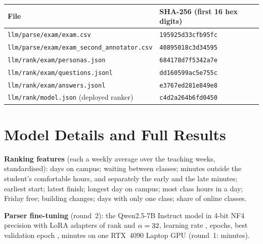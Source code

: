 \begin{center}\small
\begin{tabular}{@{}ll@{}}
	\toprule
	File & SHA-256 (first 16 hex digits) \\
	\midrule
	\texttt{llm/parse/exam/exam.csv} & \texttt{195925d33cfb95fc} \\
	\texttt{llm/parse/exam/exam\_second\_annotator.csv} & \texttt{40895018c3d34595} \\
	\texttt{llm/rank/exam/personas.json} & \texttt{684178d7f5342a7e} \\
	\texttt{llm/rank/exam/questions.jsonl} & \texttt{dd160599ac5e755c} \\
	\texttt{llm/rank/exam/answers.jsonl} & \texttt{e3767ed281e849e8} \\
	\texttt{llm/rank/model.json} (deployed ranker) & \texttt{c4d2a264b6fd0450} \\
	\bottomrule
\end{tabular}
\end{center}

\section{Model Details and Full Results}\label{app:model}

\textbf{Ranking features} (each a weekly average over the teaching weeks, standardised): days on campus; waiting between classes; minutes outside the student's comfortable hours, and separately the early and the late minutes; earliest start; latest finish; longest day on campus; most class hours in a day; Friday free; building changes; days with only one class; share of online classes.

\textbf{Parser fine-tuning} (round~2): the Qwen2.5-7B Instruct model in 4-bit NF4 precision with LoRA adapters of rank \loraRank{} and $\alpha=32$, learning rate \loraLR, \loraEpochs{} epochs, best validation epoch \loraBest, \loraMinutes{} minutes on one RTX~4090 Laptop GPU (round~1: \loraMinutesOne{} minutes).

\begin{table}[ht]
	\caption{Parsing exam (\sExamS{} AI-written sentences, \sExamC{} clauses). Clauses are scored on the annotator's clause boundaries; whole sentences run the full parser and require every condition to match. 95\% bootstrap intervals over sentences.}
	\label{tab:parse}
	\centering\small
	
\end{table}

\begin{table}[ht]
	\caption{Ranking exam: \sRankExamPersonas{} new AI-written personas with the exam writer's conditions and up to 8 timetables each, \sRankQ{} questions, \sRankScored{} with a clear answer (\sRankSame{} ``about the same'' not scored). Intervals resample personas. Top-3 hit is the share of the answerers' top three recovered, weighted for ties; ties cap it at \rCeiling.}
	\label{tab:rank}
	\centering\small
	
\end{table}

